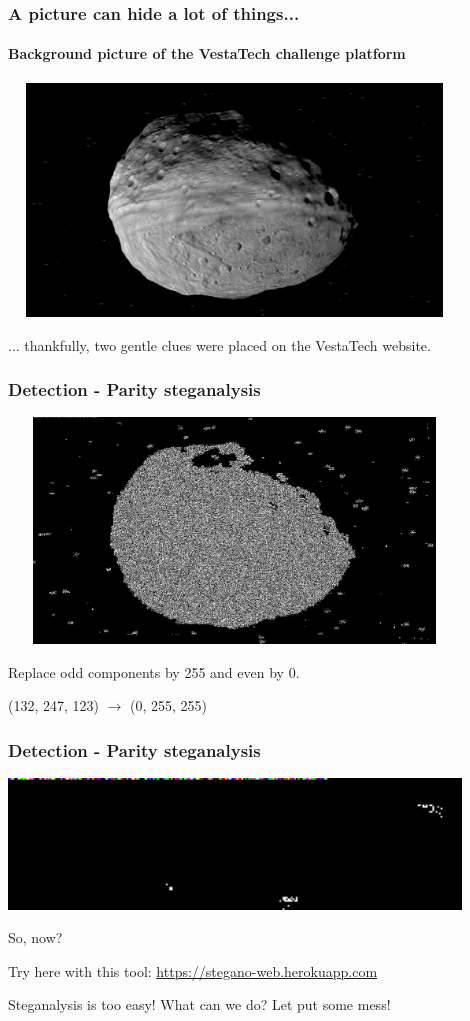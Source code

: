 \documentclass[]{beamer}
\begin{document}
\begin{frame}
\frametitle{A picture can hide a lot of things...}
\framesubtitle{Background picture of the VestaTech challenge platform}
\begin{center}
    \includegraphics[height=6.2cm, width=12.0cm]{./images/vesta.png}
\end{center}
... thankfully, two gentle clues were placed on the VestaTech website.
\end{frame}

\begin{frame}
\frametitle{Detection - Parity steganalysis}
\begin{center}
    \includegraphics[height=6.0cm, width=12.0cm]{./images/vesta_steg.png}
\end{center}
Replace odd components by 255 and even by 0.

(132, 247, 123) $\longrightarrow$ (0, 255, 255)
\end{frame}

\begin{frame}
\frametitle{Detection - Parity steganalysis}
\begin{center}
\includegraphics[width=12.0cm]{./images/vesta_steg_zoom.png}
\end{center}
\bigskip
So, now?

\bigskip
Try here with this tool: \href{https://stegano-web.herokuapp.com}{https://stegano-web.herokuapp.com}

\bigskip 
Steganalysis is too easy! What can we do? Let put some mess!
\end{frame}
\end{document}

